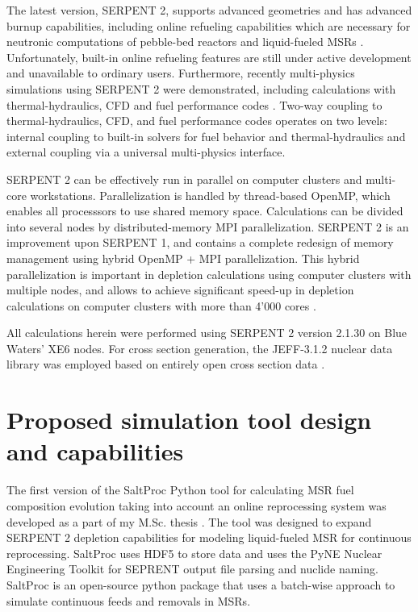 The latest version, SERPENT 2, supports advanced geometries and has advanced burnup capabilities, including online refueling capabilities which are necessary for neutronic computations of pebble-bed reactors and liquid-fueled \glspl{MSR} \cite{aufiero_extended_2013}. Unfortunately, built-in online refueling features are still under active development and unavailable to ordinary users. Furthermore, recently multi-physics simulations using SERPENT 2 were demonstrated, including  calculations with thermal-hydraulics, \gls{CFD} and fuel performance codes \cite{leppanen_numerical_2015}. Two-way coupling to thermal-hydraulics, \gls{CFD}, and fuel performance codes operates on two levels: internal coupling to built-in solvers for fuel behavior and thermal-hydraulics and external coupling via a universal multi-physics interface. 

SERPENT 2 can be effectively run in parallel on computer clusters and multi-core workstations. Parallelization is handled by thread-based OpenMP, which enables all processsors to use shared memory space. Calculations can be divided into several nodes by distributed-memory \gls{MPI} parallelization. SERPENT 2  is an improvement upon SERPENT 1, and contains a complete redesign of memory management using hybrid OpenMP \cite{dagum_openmp_1998} + \gls{MPI} parallelization.  This hybrid parallelization is important in depletion calculations using computer clusters with multiple nodes, and allows to achieve significant speed-up in depletion calculations on computer clusters with more than 4'000 cores \cite{leppanen_serpent_2015}. 

All calculations herein were performed using SERPENT 2 version 2.1.30 on Blue Waters’ XE6 nodes. For cross section generation, the JEFF-3.1.2 nuclear data library was employed based on entirely open cross section data 
\cite{oecd/nea_data_bank_jeff-3.1.2_2014}. 

\section{Proposed simulation tool design and capabilities} \label{sec:tool_design}
The first version of the SaltProc Python tool for calculating \gls{MSR} fuel 
composition evolution taking into account an online reprocessing system 
was developed as a part of my M.Sc. thesis \cite{rykhlevskii_advanced_2018,
rykhlevskii_arfc/saltproc_2018}. The tool was designed to 
expand SERPENT 2 depletion capabilities for modeling liquid-fueled \gls{MSR} 
for continuous reprocessing. SaltProc uses HDF5 
\cite{the_hdf_group_hierarchical_1997} to store 
data and uses the PyNE Nuclear Engineering Toolkit \cite{scopatz_pyne_2012}
for SEPRENT output file parsing and nuclide naming. SaltProc is an 
open-source python package that uses a batch-wise approach to simulate 
continuous feeds and removals in \glspl{MSR}. 

